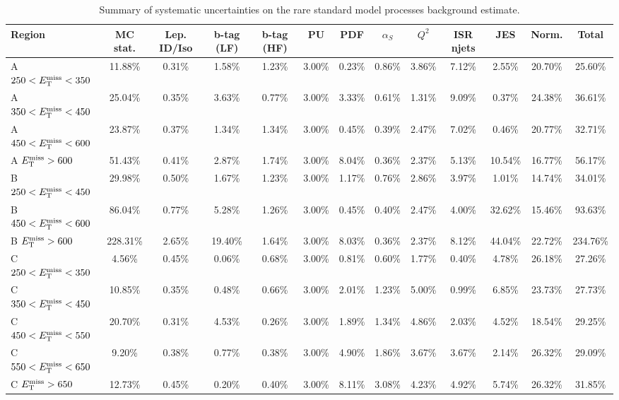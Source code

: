 \begin{table}
\centering
\footnotesize
\caption{Summary of systematic uncertainties on the rare standard
  model processes background estimate.}
\label{tab:stop:rarebkg:systematics}
\begin{tabular}{|l|ccccccccccc|c|}
\hline
Region & MC stat.   &   Lep. ID/Iso   &   b-tag (LF) &   b-tag (HF)  &   PU &   PDF &   $\alpha_S$ &   $Q^2$ &   ISR njets  & JES &   Norm.  & Total \\
\hline
 A $250<E_\text{T}^\text{miss}<350$ & 11.88\% & 0.31\%  & 1.58\%  & 1.23\%  & 3.00\%  & 0.23\%  & 0.86\%  & 3.86\%  & 7.12\%  & 2.55\%  & 20.70\% & 25.60\% \\
 A $350<E_\text{T}^\text{miss}<450$ & 25.04\% & 0.35\%  & 3.63\%  & 0.77\%  & 3.00\%  & 3.33\%  & 0.61\%  & 1.31\%  & 9.09\%  & 0.37\%  & 24.38\% & 36.61\% \\
 A $450<E_\text{T}^\text{miss}<600$ & 23.87\% & 0.37\%  & 1.34\%  & 1.34\%  & 3.00\%  & 0.45\%  & 0.39\%  & 2.47\%  & 7.02\%  & 0.46\%  & 20.77\% & 32.71\% \\
 A $E_\text{T}^\text{miss}>600$     & 51.43\% & 0.41\%  & 2.87\%  & 1.74\%  & 3.00\%  & 8.04\%  & 0.36\%  & 2.37\%  & 5.13\%  & 10.54\% & 16.77\% & 56.17\% \\
 B $250<E_\text{T}^\text{miss}<450$ & 29.98\% & 0.50\%  & 1.67\%  & 1.23\%  & 3.00\%  & 1.17\%  & 0.76\%  & 2.86\%  & 3.97\%  & 1.01\%  & 14.74\% & 34.01\% \\
 B $450<E_\text{T}^\text{miss}<600$ & 86.04\% & 0.77\%  & 5.28\%  & 1.26\%  & 3.00\%  & 0.45\%  & 0.40\%  & 2.47\%  & 4.00\%  & 32.62\% & 15.46\% & 93.63\% \\
 B $E_\text{T}^\text{miss}>600$     & 228.31\%& 2.65\%  & 19.40\% & 1.64\%  & 3.00\%  & 8.03\%  & 0.36\%  & 2.37\%  & 8.12\%  & 44.04\% & 22.72\% & 234.76\%\\
 C $250<E_\text{T}^\text{miss}<350$ & 4.56\%  & 0.45\%  & 0.06\%  & 0.68\%  & 3.00\%  & 0.81\%  & 0.60\%  & 1.77\%  & 0.40\%  & 4.78\%  & 26.18\% & 27.26\% \\
 C $350<E_\text{T}^\text{miss}<450$ & 10.85\% & 0.35\%  & 0.48\%  & 0.66\%  & 3.00\%  & 2.01\%  & 1.23\%  & 5.00\%  & 0.99\%  & 6.85\%  & 23.73\% & 27.73\% \\
 C $450<E_\text{T}^\text{miss}<550$ & 20.70\% & 0.31\%  & 4.53\%  & 0.26\%  & 3.00\%  & 1.89\%  & 1.34\%  & 4.86\%  & 2.03\%  & 4.52\%  & 18.54\% & 29.25\% \\
 C $550<E_\text{T}^\text{miss}<650$ & 9.20\%  & 0.38\%  & 0.77\%  & 0.38\%  & 3.00\%  & 4.90\%  & 1.86\%  & 3.67\%  & 3.67\%  & 2.14\%  & 26.32\% & 29.09\% \\
 C $E_\text{T}^\text{miss}>650$     & 12.73\% & 0.45\%  & 0.20\%  & 0.40\%  & 3.00\%  & 8.11\%  & 3.08\%  & 4.23\%  & 4.92\%  & 5.74\%  & 26.32\% & 31.85\% \\

\end{tabular}
\end{table}
